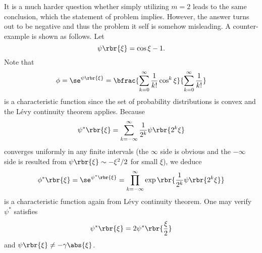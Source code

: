 \documentclass[english, nochinese]{pnote}
\begin{document}
It is a much harder question whether simply utilizing $ m = 2 $ leads to the same conclusion, which the statement of problem implies. However, the answer turns out to be negative and thus the problem it self is somehow misleading. A counter-example is shown as follows. Let
\begin{equation}
\psi \rbr{\xi} = \cos \xi - 1.
\end{equation}
Note that
\begin{equation}
\phi = \se^{ \psi \rbr{\xi} } = \bfrac{ \sum_{ k = 0 }^{\infty} \frac{1}{ k ! } \cos^k \xi }{ \sum_{ k = 0 }^{\infty} \frac{1}{ k ! } }
\end{equation}
is a characteristic function since the set of probability distributions is convex and the L\'evy continuity theorem applies. Because
\begin{equation}
\psi^{\ast} \rbr{\xi} = \sum_{ k = -\infty }^{\infty} \frac{1}{2^k} \psi \rbr{ 2^k \xi }
\end{equation}
converges uniformly in any finite intervals (the $\infty$ side is obvious and the $-\infty$ side is resulted from $ \psi \rbr{\xi} \sim -\xi^2 / 2 $ for small $\xi$), we deduce
\begin{equation}
\phi^{\ast} \rbr{\xi} = \se^{ \psi^{\ast} \rbr{\xi} } = \prod_{ k = -\infty }^{\infty} \exp \rbr{ \frac{1}{2^k} \psi \rbr{ 2^k \xi } }
\end{equation}
is a characteristic function again from L\'evy continuity theorem. One may verify $\psi^{\ast}$ satisfies
\begin{equation}
\psi^{\ast} \rbr{\xi} = 2 \psi^{\ast} \rbr{\frac{\xi}{2}}
\end{equation}
and $ \psi \rbr{\xi} \neq -\gamma \abs{\xi} $.
\end{document}
